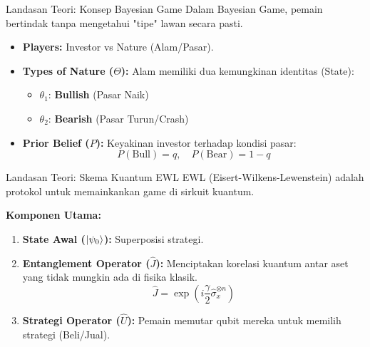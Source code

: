 \documentclass{beamer}
\begin{document}

\begin{frame}{Landasan Teori: Konsep Bayesian Game}
    Dalam Bayesian Game, pemain bertindak tanpa mengetahui "tipe" lawan secara pasti.
    
    \begin{itemize}
        \item \textbf{Players:} Investor vs Nature (Alam/Pasar).
        \item \textbf{Types of Nature ($\Theta$):}
        Alam memiliki dua kemungkinan identitas (State):
        \begin{itemize}
            \item $\theta_1$: \textbf{Bullish} (Pasar Naik)
            \item $\theta_2$: \textbf{Bearish} (Pasar Turun/Crash)
        \end{itemize}
        \item \textbf{Prior Belief ($P$):}
        Keyakinan investor terhadap kondisi pasar:
        $$ P(\text{Bull}) = q, \quad P(\text{Bear}) = 1-q $$
    \end{itemize}
\end{frame}

\begin{frame}{Landasan Teori: Skema Kuantum EWL}
    EWL (Eisert-Wilkens-Lewenstein) adalah protokol untuk memainkankan game di sirkuit kuantum.
    
    \begin{center}
    \textbf{Komponen Utama:}
    \end{center}
    
    \begin{enumerate}
        \item \textbf{State Awal ($\ket{\psi_0}$):} Superposisi strategi.
        \item \textbf{Entanglement Operator ($\hat{J}$):} 
        Menciptakan korelasi kuantum antar aset yang tidak mungkin ada di fisika klasik.
        $$ \hat{J} = \exp(i \frac{\gamma}{2} \hat{\sigma}_x^{\otimes n}) $$
        \item \textbf{Strategi Operator ($\hat{U}$):}
        Pemain memutar qubit mereka untuk memilih strategi (Beli/Jual).
    \end{enumerate}
\end{frame}


\end{document}
